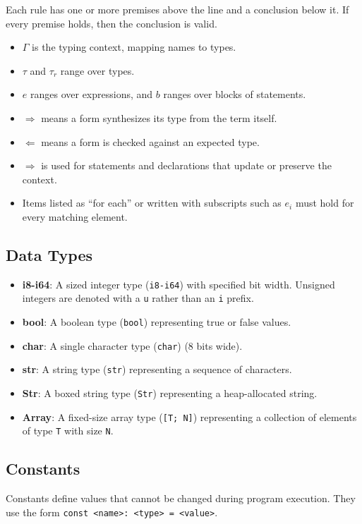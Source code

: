 \documentclass[11pt]{article}
\newcommand{\syn}{\Rightarrow} %
\newcommand{\chk}{\Leftarrow} %
\begin{document}
Each rule has one or more premises above the line and a conclusion below it. If every premise holds, then the conclusion is valid.

\begin{itemize}
    \item $\Gamma$ is the typing context, mapping names to types.
    \item $\tau$ and $\tau_r$ range over types.
    \item $e$ ranges over expressions, and $b$ ranges over blocks of statements.
    \item $\syn$ means a form synthesizes its type from the term itself.
    \item $\chk$ means a form is checked against an expected type.
    \item $\Rightarrow$ is used for statements and declarations that update or preserve the context.
    \item Items listed as ``for each'' or written with subscripts such as $e_i$ must hold for every matching element.
\end{itemize}


\subsection{Data Types}
\begin{itemize}
    \item \textbf{i8-i64}: A sized integer type (\texttt{i8-i64}) with specified bit width. Unsigned integers are denoted with a \texttt{u} rather than an \texttt{i} prefix.
    \item \textbf{bool}: A boolean type (\texttt{bool}) representing true or false values.
    \item \textbf{char}: A single character type (\texttt{char}) (8 bits wide).
    \item \textbf{str}: A string type (\texttt{str}) representing a sequence of characters.
    \item \textbf{Str}: A boxed string type (\texttt{Str}) representing a heap-allocated string.
    \item \textbf{Array}: A fixed-size array type (\texttt{[T; N]}) representing a collection of elements of type \texttt{T} with size \texttt{N}.
\end{itemize}

\subsection{Constants}
Constants define values that cannot be changed during program execution. They use the form \texttt{const <name>: <type> = <value>}.
\end{document}

